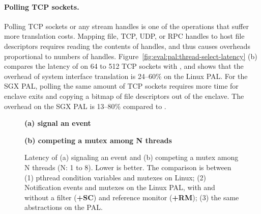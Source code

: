 \paragraph{Polling TCP sockets.}
Polling TCP sockets or any stream handles
is one of the operations that suffer more translation costs.
Mapping file, TCP, UDP, or RPC handles
to host file descriptors
requires reading the contents
of handles,
and thus causes overheads
proportional to
numbers of handles.
Figure~\ref{fig:eval:pal:thread-select-latency} (b)
compares the latency of
 on 64 to 512 TCP sockets
with ,
and shows that the overhead
of system interface translation is 24--60\% on the Linux PAL.
For the SGX PAL,
polling the same amount
of TCP sockets
requires more time for enclave exits and copying a bitmap of file descriptors
out of the enclave. 
The overhead on the SGX PAL is 13--80\%
compared to .





\begin{figure*}[t!]
\centering
\footnotesize
{}
\parbox{0.49\textwidth}{\centering\bf (a) signal an event}
\parbox{0.49\textwidth}{\centering\bf (b) competing a mutex among N threads}
\caption{Latency of (a) signaling an event and (b) competing a mutex among N threads (N: 1 to 8).
Lower is better.
The comparison is between (1) pthread condition variables and mutexes on Linux; (2) Notification events and mutexes on the Linux PAL, with and without a \seccomp{} filter ({\bf +SC}) and reference monitor ({\bf +RM}); (3) the same abstractions on the \sgx{} PAL.}
\label{fig:eval:pal:sched-latency}
\end{figure*}




